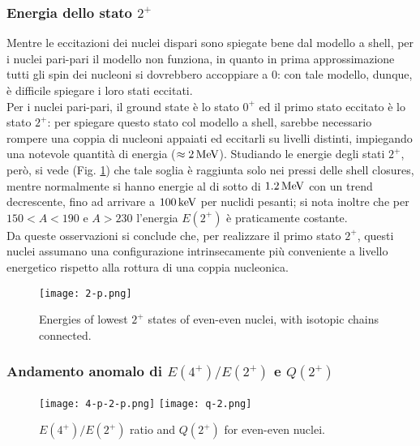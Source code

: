 \subsubsection{Energia dello stato \texorpdfstring{$ 2^+ $}{TEXT}}

Mentre le eccitazioni dei nuclei dispari sono spiegate bene dal modello a shell, per i nuclei pari-pari il modello non funziona, in quanto in prima approssimazione tutti gli spin dei nucleoni si dovrebbero accoppiare a 0: con tale modello, dunque, è difficile spiegare i loro stati eccitati.\\
Per i nuclei pari-pari, il ground state è lo stato $ 0^+ $ ed il primo stato eccitato è lo stato $ 2^+ $: per spiegare questo stato col modello a shell, sarebbe necessario rompere una coppia di nucleoni appaiati ed eccitarli su livelli distinti, impiegando una notevole quantità di energia ($ \approx 2\,\mathrm{MeV} $). Studiando le energie degli stati $ 2^+ $, però, si vede (Fig. \ref{2-p}) che tale soglia è raggiunta solo nei pressi delle shell closures, mentre normalmente si hanno energie al di sotto di $ 1.2\,\mathrm{MeV} $ con un trend decrescente, fino ad arrivare a $ 100\,\mathrm{keV} $ per nuclidi pesanti; si nota inoltre che per $ 150 < A < 190 $ e $ A > 230 $ l'energia $ E(2^+) $ è praticamente costante.\\
Da queste osservazioni si conclude che, per realizzare il primo stato $ 2^+ $, questi nuclei assumano una configurazione intrinsecamente più conveniente a livello energetico rispetto alla rottura di una coppia nucleonica.

\begin{figure}[!t]
	\centering
	\texttt{[image: 2-p.png]}
	\caption{Energies of lowest $ 2^+ $ states of even-even nuclei, with isotopic chains connected.}
	\label{2-p}
\end{figure}

\subsubsection{Andamento anomalo di \texorpdfstring{$ E(4^+) / E(2^+) $}{TEXT} e \texorpdfstring{$ Q(2^+) $}{TEXT}}

\begin{figure}[!b]
	\centering
	\texttt{[image: 4-p-2-p.png]}
	\texttt{[image: q-2.png]}
	\caption{$ E(4^+) / E(2^+) $ ratio and $ Q(2^+) $ for even-even nuclei.}
	\label{4-p-2-p}
\end{figure}

